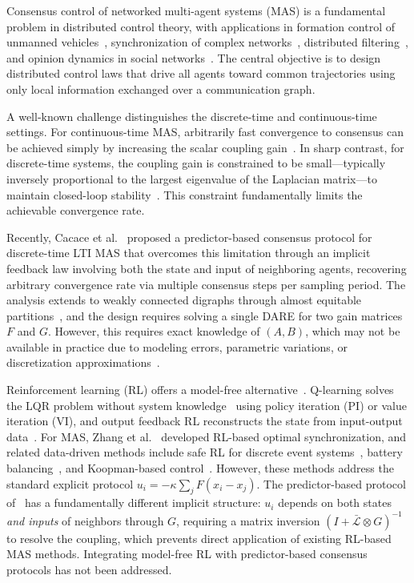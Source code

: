 \documentclass[12pt]{elsarticle}
\theoremstyle{remark}
\begin{document}
Consensus control of networked multi-agent systems (MAS) is a fundamental problem in distributed control theory, with applications in formation control of unmanned vehicles~\cite{francis2016,dony2021distributed,dong2020tracking}, synchronization of complex networks~\cite{dorfler2014,li2010}, distributed filtering~\cite{battistelli2014}, and opinion dynamics in social networks~\cite{proskurnikov2017}. The central objective is to design distributed control laws that drive all agents toward common trajectories using only local information exchanged over a communication graph.

A well-known challenge distinguishes the discrete-time and continuous-time settings. For continuous-time MAS, arbitrarily fast convergence to consensus can be achieved simply by increasing the scalar coupling gain~\cite{li2014,liu2021}. In sharp contrast, for discrete-time systems, the coupling gain is constrained to be small---typically inversely proportional to the largest eigenvalue of the Laplacian matrix---to maintain closed-loop stability~\cite{ma2015,ren2010,xiao2004}. This constraint fundamentally limits the achievable convergence rate.

Recently, Cacace et al.~\cite{cacace2024} proposed a predictor-based consensus protocol for discrete-time LTI MAS that overcomes this limitation through an implicit feedback law involving both the state and input of neighboring agents, recovering arbitrary convergence rate via multiple consensus steps per sampling period. The analysis extends to weakly connected digraphs through almost equitable partitions~\cite{monaco2019}, and the design requires solving a single DARE for two gain matrices $F$ and $G$. However, this requires exact knowledge of $(A,B)$, which may not be available in practice due to modeling errors, parametric variations, or discretization approximations~\cite{dony2020tracking,dong2020tracking,dony2021robust}.

Reinforcement learning (RL) offers a model-free alternative~\cite{lewis2009}. Q-learning solves the LQR problem without system knowledge~\cite{bradtke1994} using policy iteration (PI) or value iteration (VI), and output feedback RL reconstructs the state from input-output data~\cite{lewis2009,rizvi2022}. For MAS, Zhang et al.~\cite{zhang2011} developed RL-based optimal synchronization, and related data-driven methods include safe RL for discrete event systems~\cite{dony2025debf}, battery balancing~\cite{dony2026battery}, and Koopman-based control~\cite{dony2024koopman}. However, these methods address the standard explicit protocol $u_i = -\kappa \sum_j F(x_i - x_j)$. The predictor-based protocol of~\cite{cacace2024} has a fundamentally different implicit structure: $u_i$ depends on both states \emph{and inputs} of neighbors through $G$, requiring a matrix inversion $(I + \bar{\mathcal{L}} \otimes G)^{-1}$ to resolve the coupling, which prevents direct application of existing RL-based MAS methods. Integrating model-free RL with predictor-based consensus protocols has not been addressed.
\end{document}
